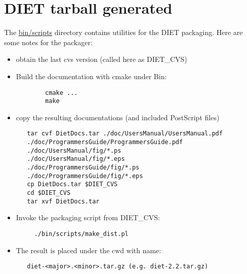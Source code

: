 
\section{DIET tarball generated}

The \url{bin/scripts} directory contains utilities for the DIET packaging. Here are some notes for the packager:

\begin{itemize} 
\item obtain the last cvs version (called here as DIET\_CVS)
\item Build the documentation with cmake under Bin:
\begin{verbatim}
        cmake ...
        make
\end{verbatim}
\item copy the resulting documentations (and included PostScript files)
\begin{verbatim}
   tar cvf DietDocs.tar ./doc/UsersManual/UsersManual.pdf 
   ./doc/ProgrammersGuide/ProgrammersGuide.pdf 
   ./doc/UsersManual/fig/*.ps      
   ./doc/UsersManual/fig/*.eps     
   ./doc/ProgrammersGuide/fig/*.ps 
   ./doc/ProgrammersGuide/fig/*.eps
   cp DietDocs.tar $DIET_CVS
   cd $DIET_CVS
   tar xvf DietDocs.tar
\end{verbatim}

\item Invoke the packaging script from DIET\_CVS:
\begin{verbatim}
     ./bin/scripts/make_dist.pl
\end{verbatim}
\item The result is placed under the cwd with name:
\begin{verbatim}
   diet-<major>.<minor>.tar.gz (e.g. diet-2.2.tar.gz)
\end{verbatim}
\end{itemize} 

